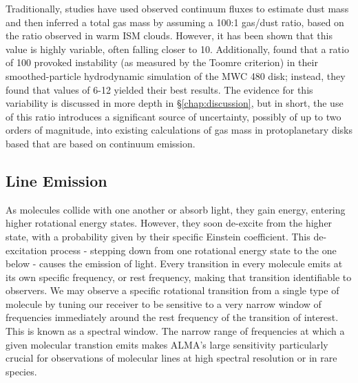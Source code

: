 
Traditionally, studies have used observed continuum fluxes to estimate dust mass and then inferred a total gas mass by assuming a 100:1 gas/dust ratio, based on the ratio observed in warm ISM clouds. However, it has been shown \citep[e.g][]{Miotello2016,Miotello2017} that this value is highly variable, often falling closer to 10. Additionally, \citet{Liu2018} found that a ratio of 100 provoked instability (as measured by the Toomre criterion) in their smoothed-particle hydrodynamic simulation of the MWC 480 disk; instead, they found that values of 6-12 yielded their best results. The evidence for this variability is discussed in more depth in \S\ref{chap:discussion}, but in short, the use of this ratio introduces a significant source of uncertainty, possibly of up to two orders of magnitude, into existing calculations of gas mass in protoplanetary disks based that are based on continuum emission.









\subsection{Line Emission}

As molecules collide with one another or absorb light, they gain energy, entering higher rotational energy states. However, they soon de-excite from the higher state, with a probability given by their specific Einstein coefficient. This de-excitation process - stepping down from one rotational energy state to the one below - causes the emission of light. Every transition in every molecule emits at its own specific frequency, or rest frequency, making that transition identifiable to observers. We may observe a specific rotational transition from a single type of molecule by tuning our receiver to be sensitive to a very narrow window of frequencies immediately around the rest frequency of the transition of interest. This is known as a spectral window. The narrow range of frequencies at which a given molecular transtion emits makes ALMA's large sensitivity particularly crucial for observations of molecular lines at high spectral resolution or in rare species.

